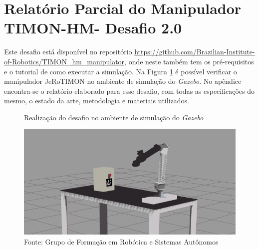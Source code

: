




\section{Relatório Parcial do Manipulador TIMON-HM- Desafio 2.0 }
\label{sec:desafio_2}
Este desafio está disponível no repositório \url{https://github.com/Brazilian-Institute-of-Robotics/TIMON\_hm\_manipulator}, onde neste também tem os pré-requisitos e o tutorial de como executar a simulação. Na Figura \ref{fig:manipulador_simulacao} é possível verificar o manipulador JeRoTIMON no ambiente de simulação do \textit{Gazebo}. No apêndice encontra-se o relatório elaborado para esse desafio, com todas as especificações do mesmo, o estado da arte, metodologia e materiais utilizados.

\begin{figure}[H]
    \caption{Realização do desafio no ambiente de simulação do \textit{Gazebo}}
    \centering
    \includegraphics[width= \textwidth]{Figures/manipulador_simulacao.png}
    \caption*{Fonte: Grupo de Formação em Robótica e Sistemas Autônomos}
    \label{fig:manipulador_simulacao}
\end{figure}



